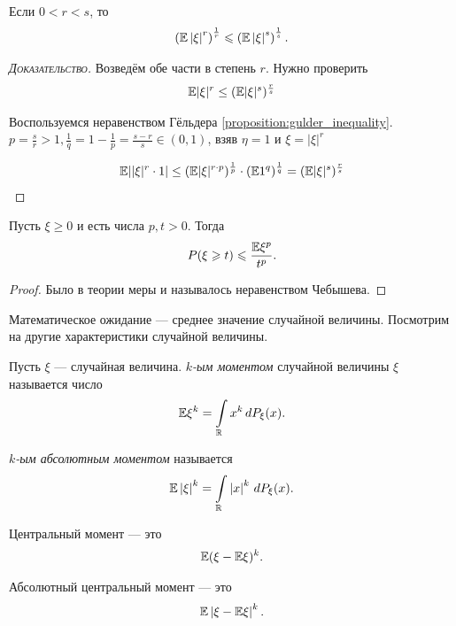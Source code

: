\documentclass[../main.tex]{subfiles}
\begin{document}
\begin{prop}
 \label{proposition:Lyapunov_inequality}
 Если $ 0 < r < s $, то 
 \begin{align*}
  \left(\mathbb E \left| \xi \right|^{r} \right)^{\frac{1}{r}} \leqslant \left( \mathbb E \left| \xi \right|^{s} \right)^{\frac{1}{s}}.
 \end{align*} 
\end{prop}
\begin{proof}[\normalfont\textsc{Доказательство}]
	Возведём обе части в степень $r$. Нужно проверить 
	\begin{align*}
		\mathbb E |\xi|^r \le (\mathbb E |\xi|^s)^{\frac{r}{s}}
	\end{align*}

	Воспользуемся неравенством Гёльдера \ref{proposition:gulder_inequality}. $p = \frac{s}{r} > 1, \frac{1}{q} = 1 - \frac{1}{p} = \frac{s - r}{s} \in (0, 1)$, взяв $\eta = 1$ и $\xi = |\xi|^{r}$  

	\begin{align*}
		\mathbb E ||\xi|^r \cdot 1| \le (\mathbb E |\xi|^{r \cdot p})^{\frac{1}{p}} \cdot (\mathbb E 1^q)^{\frac{1}{q}} = (\mathbb E |\xi|^s)^{\frac{r}{s}}
	\end{align*}
	
\end{proof}


\begin{prop}
 Пусть $ \xi \geqslant 0 $ и есть числа $ p,t > 0 $. Тогда
  \begin{align}
   \label{equation:markov_inequality}
  P(\xi \geqslant t) \leqslant \frac{\mathbb E \xi^{p}}{t^{p}}.
 \end{align}  
\end{prop}

\begin{proof}
	Было в теории меры и называлось неравенством Чебышева.

\end{proof}

Математическое ожидание --- среднее значение случайной величины. Посмотрим на другие характеристики случайной величины.

\begin{df}
 Пусть $ \xi $ --- случайная величина. \textit{$ k $-ым моментом} случайной величины $ \xi $ называется число
 \begin{align*}
  \mathbb E \xi^{k} = \int\limits_{\mathbb{R}} x^{k}\,dP_{\xi}(x).
 \end{align*} 

  \textit{$ k $-ым абсолютным моментом} называется
 \begin{align*}
  \mathbb E \left| \xi \right|^{k} = \int\limits_{\mathbb{R}} \left| x \right|^{k}\,dP_{\xi} (x).
 \end{align*} 

 Центральный момент --- это
 \begin{align*}
  \mathbb E (\xi - \mathbb E \xi)^{k}.
 \end{align*} 

 Абсолютный центральный момент --- это
 \begin{align*}
  \mathbb E \left| \xi - \mathbb E \xi \right|^{k}.
 \end{align*} 
\end{df}
\end{document}
